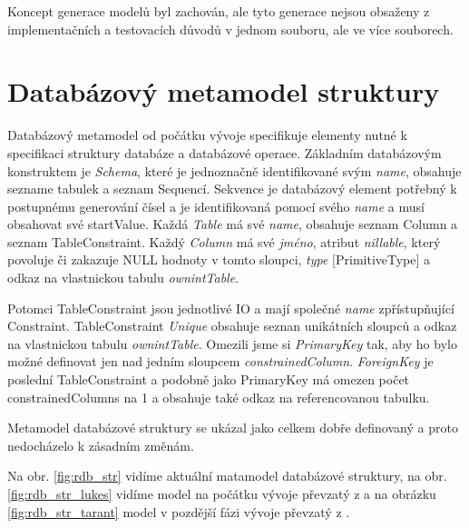 \documentclass[11pt,twoside,a4paper]{book}
\begin{document}
Koncept generace modelů byl zachován, ale tyto generace nejsou obsaženy z
implementačních a testovacích důvodů v jednom souboru, ale ve více souborech.


\section{Databázový metamodel struktury}

 Databázový metamodel od počátku vývoje specifikuje elementy nutné k specifikaci
 struktury databáze a databázové operace. Základním databázovým
 konstruktem je \textit{Schema}, které je jednoznačně identifikované svým
 \textit{name}, obsahuje sezname tabulek a seznam Sequencí. Sekvence je
 databázový element potřebný k postupnému generování čísel a je
 identifikovaná pomocí svého \textit{name} a musí obsahovat své startValue.
 Každá \textit{Table} má své \textit{name}, obsahuje seznam Column a seznam
 TableConstraint. Každý \textit{Column} má své \textit{jméno}, atribut
 \textit{nillable}, který povoluje či zakazuje NULL hodnoty v tomto sloupci,
 \textit{type} [PrimitiveType] a odkaz na vlastnickou tabulu
 \textit{ownintTable}.

Potomci TableConstraint jsou jednotlivé IO a mají společné \textit{name}
zpřístupňující Constraint.  TableConstraint \textit{Unique} obsahuje seznan
unikátních sloupců a odkaz na vlastnickou tabulu \textit{ownintTable}. Omezili
jsme si \textit{PrimaryKey} tak, aby ho bylo možné definovat jen nad jedním
sloupcem \textit{constrainedColumn}. \textit{ForeignKey} je poslední
TableConstraint a podobně jako PrimaryKey má omezen počet constrainedColumns na
1 a obsahuje také odkaz na referencovanou tabulku.

 Metamodel databázové struktury se ukázal jako celkem dobře definovaný a proto
 nedocházelo k zásadním změnám.

 Na obr. \ref{fig:rdb_str} vidíme aktuální matamodel databázové struktury, na
 obr. \ref{fig:rdb_str_lukes} vidíme model na počátku vývoje převzatý z
 \cite{Lukes} a na obrázku \ref{fig:rdb_str_tarant} model v pozdější fázi vývoje
 převzatý z \cite{Tarant_bp}.
\end{document}
